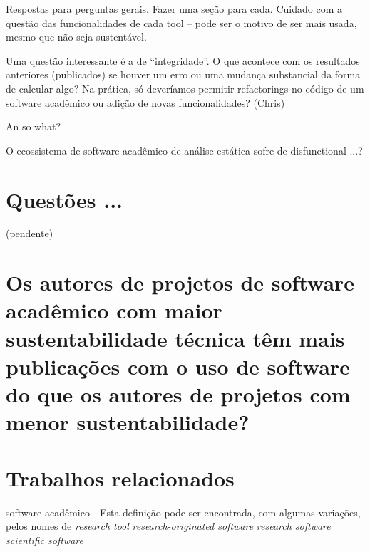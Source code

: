 \label{discussao}

Respostas para perguntas gerais. Fazer uma seção para cada.
Cuidado com a questão das funcionalidades de cada tool -- pode ser o motivo de ser mais usada,
mesmo que não seja sustentável.

Uma questão interessante é a de ``integridade''. 
O que acontece com os resultados anteriores (publicados)
se houver um erro ou uma mudança substancial da forma de calcular algo?
Na prática, só deveríamos permitir refactorings no código 
de um software acadêmico ou adição de novas funcionalidades?
(Chris)

An so what?

O ecossistema de software acadêmico de análise estática sofre de disfunctional ...?


\section{Questões ...} 

(pendente)

\section{Os autores de projetos de software acadêmico com maior sustentabilidade técnica têm mais publicações com o uso de software do que os autores de projetos com menor sustentabilidade?}

\section{Trabalhos relacionados}

software acadêmico - Esta definição pode ser encontrada, com algumas variações, pelos nomes de
{\it research tool} %
{\it research-originated software} %
{\it research software} %
{\it scientific software} %


